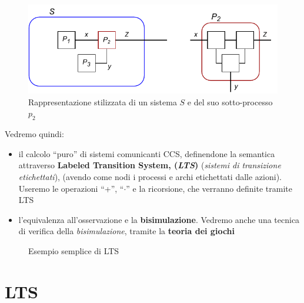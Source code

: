 \begin{itemize}
\begin{figure}[H]
  \includegraphics[scale = 0.9]{img/proc.pdf}
  \caption{Rappresentazione stilizzata di un sistema $S$ e del suo sotto-processo
    $p_2$}
  \label{fig:proc}
\end{figure}
  \end{itemize}

Vedremo quindi:
\begin{itemize}
  \item il calcolo ``puro'' di sistemi comunicanti CCS, definendone la semantica
  attraverso \textbf{Labeled Transition System, (\textit{LTS})} (\textit{sistemi
    di transizione etichettati}), (avendo come nodi i processi e archi
  etichettati dalle azioni). Useremo le operazioni ``+'', ``$\cdot$'' e la
  ricorsione, che verranno definite tramite LTS
  \item l'equivalenza all'osservazione e la \textbf{bisimulazione}. Vedremo
  anche una tecnica di verifica della \textit{bisimulazione}, tramite la
  \textbf{teoria dei giochi}
\end{itemize}
\begin{figure}
  \centering
  \caption{Esempio semplice di LTS}
  \label{fig:l}
\end{figure}
\section{LTS}
